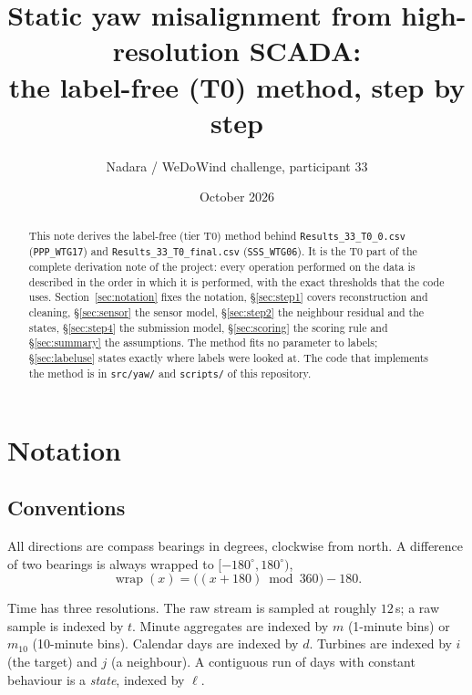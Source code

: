\documentclass[11pt,a4paper]{article}
\title{Static yaw misalignment from high-resolution SCADA:\\
       the label-free (T0) method, step by step}
\author{Nadara / WeDoWind challenge, participant 33}
\date{October 2026}
\theoremstyle{remark}
\newcommand{\wrap}{\operatorname{wrap}}
\newcommand{\dg}{^{\circ}}
\newcommand{\code}[1]{\texttt{#1}}
\begin{document}
\maketitle

\begin{abstract}
\sloppy
This note derives the label-free (tier T0) method behind
\code{Results\_33\_T0\_0.csv} (\code{PPP\_WTG17}) and
\code{Results\_33\_T0\_final.csv} (\code{SSS\_WTG06}). It is the T0 part of the
complete derivation note of the project: every operation performed on the data
is described in the order in which it is performed, with the exact thresholds
that the code uses. Section~\ref{sec:notation} fixes the notation,
\S\ref{sec:step1} covers reconstruction and cleaning, \S\ref{sec:sensor} the
sensor model, \S\ref{sec:step2} the neighbour residual and the states,
\S\ref{sec:step4} the submission model, \S\ref{sec:scoring} the scoring rule and
\S\ref{sec:summary} the assumptions. The method fits no parameter to labels;
\S\ref{sec:labeluse} states exactly where labels were looked at. The code
that implements the method is in \code{src/yaw/} and \code{scripts/} of this
repository.
\end{abstract}

\tableofcontents

\section{Notation}\label{sec:notation}

\subsection{Conventions}
All directions are compass bearings in degrees, clockwise from north. A difference
of two bearings is always wrapped to $[-180\dg,180\dg)$,
\begin{equation}
  \wrap(x) = \big((x+180) \bmod 360\big) - 180 .
  \label{eq:wrap}
\end{equation}

Time has three resolutions. The raw stream is sampled at roughly $12$\,s; a raw
sample is indexed by $t$. Minute aggregates are indexed by $m$ (1-minute bins) or
$m_{10}$ (10-minute bins). Calendar days are indexed by $d$. Turbines are indexed
by $i$ (the target) and $j$ (a neighbour). A contiguous run of days with constant
behaviour is a \emph{state}, indexed by $\ell$.
\end{document}
